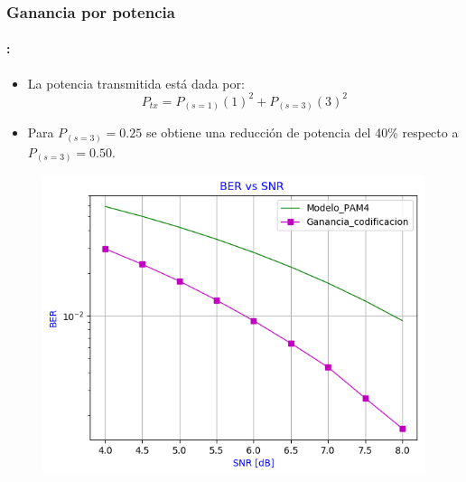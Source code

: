 \begin{frame}
  \frametitle{\textbf{Ganancia por potencia}}
\framesubtitle{\secname : \subsecname}
   \begin{block}{}
    \begin{itemize}
    \item La potencia transmitida está dada por:
        \begin{equation*}
            P_{tx} = P_{(s = 1)}  (1)^{2} + P_{(s = 3)}  (3)^{2}
        \end{equation*}
    \item Para $ P_{(s = 3)}=0.25$ se obtiene una reducción de potencia del 40\% respecto a $ P_{(s = 3)}=0.50$.
    \end{itemize}
    \end{block}
     \vspace{-0.3cm}

   \begin{figure}
  \centering
  \includegraphics[width=0.45\paperwidth]{Graficos/BER_vs_SNR_3.png}%
\end{figure}
\end{frame}


